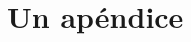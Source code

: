 \documentclass[a4paper,
	11pt,
	parskip=full,
	bibliography=totoc,
	twoside
	]{scrartcl}
\let\oldsection\section
\def\section{\cleardoubleoddpage\oldsection}
\renewcommand{\sectionmark}[1]{\markright{\thesection.\ #1}}
\begin{document}
\cleardoubleoddpage
	\renewcommand{\sectionmark}[1]{}
\begin{thebibliography}{9}
	\raggedright
	
\end{thebibliography}
\markright{\appendixname}

\cleardoubleoddpage
\appendix
{}

\section{Un apéndice}
	\FloatBarrier
\end{document}
